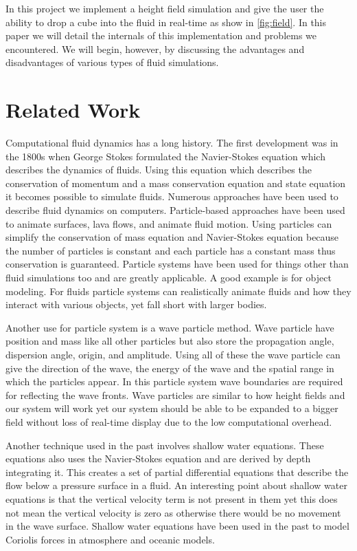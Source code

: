 \documentclass[12pt,titlepage]{article}
\begin{document}
In this project we implement a height field simulation and give the user the 
ability to drop a cube into the fluid in real-time as show in \ref{fig:field}.  
In this paper we will detail the internals of this implementation and problems 
we encountered.  We will begin, however, by discussing the advantages and 
disadvantages of various types of fluid simulations.

\section{Related Work}

Computational fluid dynamics has a long history. The first development was in 
the 1800s when George Stokes formulated the Navier-Stokes equation which 
describes the dynamics of fluids. Using this equation which describes the 
conservation of momentum and a mass conservation equation and state equation it 
becomes possible to simulate fluids. \cite{particle}
Numerous approaches have been used to describe fluid dynamics on computers. 
Particle-based approaches have been used to animate surfaces, lava flows, and 
animate fluid motion. \cite{smooth}\cite{dynamic}\cite{implicit} Using 
particles can simplify the conservation of mass equation and Navier-Stokes 
equation because the number of particles is constant and each particle has a 
constant mass thus conservation is guaranteed.
Particle systems have been used for things other than fluid simulations too and 
are greatly applicable. A good example is for object modeling. \cite{oriented} 
For fluids 
particle systems can realistically animate fluids and how they interact with 
various objects, yet fall short with larger bodies. \cite{particle}

Another use for particle system is a wave particle method. Wave particle have 
position and mass like all other particles but also store the propagation 
angle, dispersion angle, origin, and amplitude. Using all of these the wave 
particle can give the direction of the wave, the energy of the wave and the 
spatial range in which the particles appear. In this particle system wave 
boundaries are required for reflecting the wave fronts. \cite{realtime} Wave 
particles are similar to how height fields and our system will work yet our 
system should be able to be expanded to a bigger field without loss of 
real-time display due to the low computational overhead.

Another technique used in the past involves shallow water equations. These 
equations also uses the Navier-Stokes equation and are derived by depth 
integrating it. This creates a set of partial differential equations that 
describe the flow below a pressure surface in a fluid.  An interesting point 
about shallow water equations is that the vertical velocity term is not present 
in them yet this does not mean the vertical velocity is zero as otherwise there 
would be no movement in the wave surface. Shallow water equations have been 
used in the past to model Coriolis forces in atmosphere and oceanic models. 
\cite{shalloweq}
\end{document}
